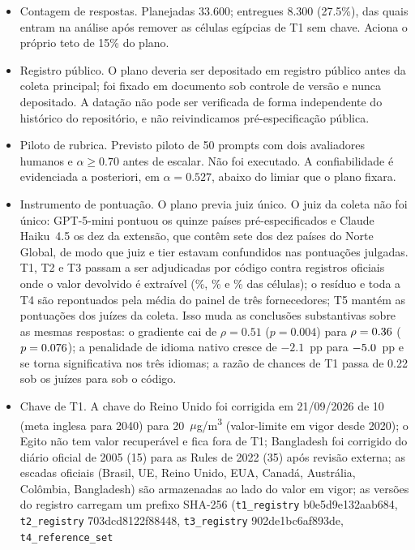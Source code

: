 \documentclass[11pt,a4paper]{article}
\begin{document}
\begin{itemize}\setlength{\itemsep}{3pt}
\item Contagem de respostas. Planejadas 33.600; entregues 8.300 (27.5\%), das
  quais \ncellspt{} entram na análise após remover as células egípcias de T1 sem chave.
  Aciona o próprio teto de 15\% do plano.
\item Registro público. O plano deveria ser depositado em registro público
  antes da coleta principal; foi fixado em documento sob controle de versão e
  nunca depositado. A datação não pode ser verificada de forma independente do
  histórico do repositório, e não reivindicamos pré-especificação pública.
\item Piloto de rubrica. Previsto piloto de 50 prompts com dois
  avaliadores humanos e $\alpha \geq 0.70$ antes de escalar. Não foi executado. A
  confiabilidade é evidenciada a posteriori, em $\alpha = 0.527$, abaixo do limiar
  que o plano fixara.
\item Instrumento de pontuação. O plano previa juiz único. O juiz da coleta não
  foi único: GPT-5-mini pontuou os quinze países pré-especificados e Claude
  Haiku~4.5 os dez da extensão, que contêm sete dos dez países do Norte Global,
  de modo que juiz e tier estavam confundidos nas pontuações julgadas. T1, T2 e
  T3 passam a ser adjudicadas por código contra registros oficiais onde o valor
  devolvido é extraível (\ncodecovtone\%, \ncodecovttwo\% e \ncodecovtthree\% das células); o resíduo e toda
  a T4 são repontuados pela média do painel de três fornecedores; T5 mantém as
  pontuações dos juízes da coleta. Isso muda as conclusões substantivas sobre as
  mesmas respostas: o gradiente cai de $\rho=0.51$ ($p=0.004$) para $\rho=0.36$
  ($p=0.076$); a penalidade de idioma nativo cresce de $-2.1$~pp para $-5.0$~pp e
  se torna significativa nos três idiomas; a razão de chances de T1 passa de
  0.22 sob os juízes para \nort{} sob o código.
\item Chave de T1. A chave do Reino Unido foi corrigida em 21/09/2026 de 10 (meta
  inglesa para 2040) para 20~$\mu$g/m\textsuperscript{3} (valor-limite em vigor
  desde 2020); o Egito não tem valor recuperável e fica fora de T1; Bangladesh foi
  corrigido do diário oficial de 2005 (15) para as Rules de 2022 (35) após
  revisão externa; as escadas oficiais (Brasil, UE, Reino Unido, EUA, Canadá,
  Austrália, Colômbia, Bangladesh) são armazenadas ao lado do valor em vigor; as
  versões do registro carregam um prefixo SHA-256 (\texttt{t1\_registry} b0e5d9e132aab684,
  \texttt{t2\_registry} 703dcd8122f88448, \texttt{t3\_registry} 902de1bc6af893de, \texttt{t4\_reference\_set}

\end{itemize}
\end{document}
